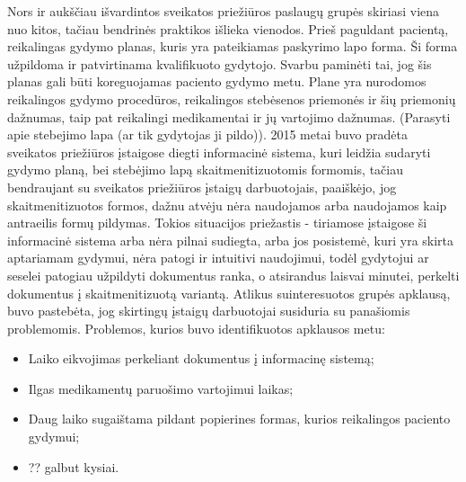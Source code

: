 Nors ir aukščiau išvardintos sveikatos priežiūros paslaugų grupės skiriasi viena nuo kitos, tačiau bendrinės praktikos išlieka vienodos. Prieš paguldant pacientą, reikalingas gydymo planas, kuris yra pateikiamas paskyrimo lapo forma. Ši forma užpildoma ir patvirtinama kvalifikuoto gydytojo. Svarbu paminėti tai, jog šis planas gali būti koreguojamas paciento gydymo metu. Plane yra nurodomos reikalingos gydymo procedūros, reikalingos stebėsenos priemonės ir šių priemonių dažnumas, taip pat reikalingi medikamentai ir jų vartojimo dažnumas. (Parasyti apie stebejimo lapa (ar tik gydytojas ji pildo)). 2015 metai buvo pradėta sveikatos priežiūros įstaigose diegti informacinė sistema, kuri leidžia sudaryti gydymo planą, bei stebėjimo lapą skaitmenitizuotomis formomis, tačiau bendraujant su sveikatos priežiūros įstaigų darbuotojais, paaiškėjo, jog skaitmenitizuotos formos, dažnu atvėju nėra naudojamos arba naudojamos kaip antraeilis formų pildymas. Tokios situacijos priežastis - tiriamose įstaigose ši informacinė sistema arba nėra pilnai sudiegta, arba jos posistemė, kuri yra skirta aptariamam gydymui, nėra patogi ir intuitivi naudojimui, todėl gydytojui ar seselei patogiau užpildyti dokumentus ranka, o atsirandus laisvai minutei, perkelti dokumentus į skaitmenitizuotą variantą. Atlikus suinteresuotos grupės apklausą, buvo pastebėta, jog skirtingų įstaigų darbuotojai susiduria su panašiomis problemomis. Problemos, kurios buvo identifikuotos apklausos metu: 
\begin{itemize}
    \item Laiko eikvojimas perkeliant dokumentus į informacinę sistemą;
    \item Ilgas medikamentų paruošimo vartojimui laikas;
    \item Daug laiko sugaištama pildant popierines formas, kurios reikalingos paciento gydymui;
    \item ?? galbut kysiai.
\end{itemize}



